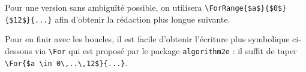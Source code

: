 Pour une version sans ambiguïté possible, on utilisera \verb+\ForRange{$a$}{$0$}{$12$}{...}+ afin d'obtenir la rédaction plus longue suivante.

\begin{algo}[.55]
\end{algo}


\medskip


Pour en finir avec les boucles, il est facile d'obtenir l'écriture plus symbolique ci-dessous via \verb+\For+ qui est proposé par le package \verb+algorithm2e+ : il suffit de taper \verb+\For{$a \in 0\,..\,12$}{...}+.

\begin{algo}[.55]
\end{algo}
